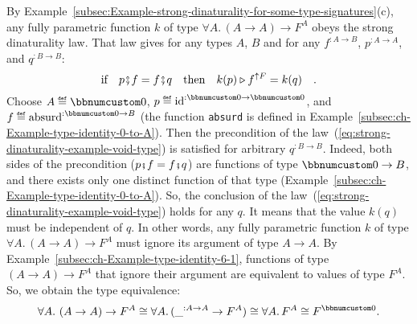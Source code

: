 By Example~\ref{subsec:Example-strong-dinaturality-for-some-type-signatures}(c),
any fully parametric function $k$ of type $\forall A.\,\left(A\rightarrow A\right)\rightarrow F^{A}$
obeys the strong dinaturality law. That law gives for any types $A$,
$B$ and for any $f^{:A\rightarrow B}$, $p^{:A\rightarrow A}$, and
$q^{:B\rightarrow B}$:
\begin{equation}
\text{if}\quad p\bef f=f\bef q\quad\text{then}\quad k(p)\triangleright f^{\uparrow F}=k(q)\quad.\label{eq:strong-dinaturality-example-void-type}
\end{equation}
Choose $A\triangleq\bbnum 0$, $p\triangleq\text{id}^{:\bbnum 0\rightarrow\bbnum 0}$,
and $f\triangleq\text{absurd}^{:\bbnum 0\rightarrow B}$ (the function
\lstinline!absurd! is defined in Example~\ref{subsec:ch-Example-type-identity-0-to-A}).
Then the precondition of the law~(\ref{eq:strong-dinaturality-example-void-type})
is satisfied for arbitrary $q^{:B\rightarrow B}$. Indeed, both sides
of the precondition ($p\bef f=f\bef q$) are functions of type $\bbnum 0\rightarrow B$,
and there exists only one distinct function of that type (Example~\ref{subsec:ch-Example-type-identity-0-to-A}).
So, the conclusion of the law~(\ref{eq:strong-dinaturality-example-void-type})
holds for any $q$. It means that the value $k(q)$ must be independent
of $q$. In other words, any fully parametric function $k$ of type
$\forall A.\,\left(A\rightarrow A\right)\rightarrow F^{A}$ must ignore
its argument of type $A\rightarrow A$. By Example~\ref{subsec:ch-Example-type-identity-6-1},
functions of type $\left(A\rightarrow A\right)\rightarrow F^{A}$
that ignore their argument are equivalent to values of type $F^{A}$.
So, we obtain the type equivalence:
\[
\forall A.\,\left(A\rightarrow A\right)\rightarrow F^{A}\cong\forall A.\,(\_^{:A\rightarrow A}\rightarrow F^{A})\cong\forall A.\,F^{A}\cong F^{\bbnum 0}.
\]

